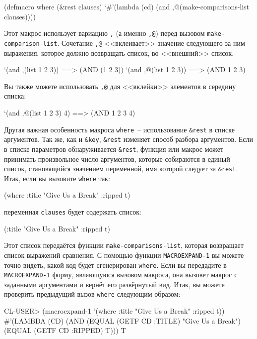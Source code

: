 \begin{myverb}
(defmacro where (&rest clauses)
  `#'(lambda (cd) (and ,@(make-comparisons-list clauses))))
\end{myverb}

Этот макрос использует вариацию \lstinline{,} (а именно \lstinline{,@}) перед вызовом
\lstinline{make-comparison-list}. Сочетание \lstinline{,@} <<вклеивает>> значение следующего за ним
выражения, которое должно возвращать список, во <<внешний>> список.

\begin{myverb}
`(and ,(list 1 2 3))  ==> (AND (1 2 3))
`(and ,@(list 1 2 3)) ==> (AND 1 2 3)
\end{myverb}

Вы также можете использовать \lstinline{,@} для <<вклейки>> элементов в середину списка:

\begin{myverb}
`(and ,@(list 1 2 3) 4) ==> (AND 1 2 3 4)
\end{myverb}

Другая важная особенность макроса \lstinline{where}~-- использование \lstinline{&rest} в списке
аргументов. Так же, как и \lstinline!&key!, \lstinline{&rest} изменяет способ разбора
аргументов. Если в списке параметров обнаруживается \lstinline{&rest}, функция или макрос может
принимать произвольное число аргументов, которые собираются в единый список, становящийся
значением переменной, имя которой следует за \lstinline{&rest}. Итак, если вы вызовите
\lstinline{where} так:

\begin{myverb}
(where :title "Give Us a Break" :ripped t)
\end{myverb}

\noindent{}переменная \lstinline{clauses} будет содержать список:

\begin{myverb}
(:title "Give Us a Break" :ripped t)
\end{myverb}

Этот список передаётся функции \lstinline{make-comparisons-list}, которая возвращает список
выражений сравнения. С помощью функции \lstinline{MACROEXPAND-1} вы можете точно видеть,
какой код будет сгенерирован \lstinline{where}. Если вы передадите в \lstinline{MACROEXPAND-1}
форму, являющуюся вызовом макроса, она вызовет макрос с заданными аргументами и вернёт его
развёрнутый вид. Итак, вы можете проверить предыдущий вызов \lstinline{where} следующим
образом:

\begin{myverb}
CL-USER> (macroexpand-1 '(where :title "Give Us a Break" :ripped t))
#'(LAMBDA (CD)
    (AND (EQUAL (GETF CD :TITLE) "Give Us a Break")
         (EQUAL (GETF CD :RIPPED) T)))
T
\end{myverb}

